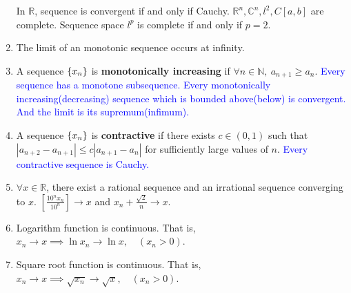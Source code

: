 \begin{enumerate}
		\subitem In $\mathbb{R}$, sequence is convergent if and only if Cauchy.
		\subitem $\mathbb{R}^n,\mathbb{C}^n,l^2,C[a,b]$ are complete.
		\subitem Sequence space $l^p$ is complete if and only if $p=2$.
	\item The limit of an monotonic sequence occurs at infinity.
	\item A sequence $\{x_n\}$ is \textbf{monotonically increasing} if $\forall n \in \mathbb{N},\ a_{n+1} \ge a_n$.
		\subitem \textcolor{blue}{Every sequence has a monotone subsequence.}
		\subitem \textcolor{blue}{Every monotonically increasing(decreasing) sequence which is bounded above(below) is convergent. And the limit is its supremum(infimum).}
	\item A sequence $\{x_n\}$ is \textbf{contractive} if there exists $c \in (0,1)$ such that $|a_{n+2}-a_{n+1}| \le c|a_{n+1}-a_n|$ for sufficiently large values of $n$.
		\subitem \textcolor{blue}{Every contractive sequence is Cauchy.}
	\item $\forall x \in \mathbb{R}$, there exist a rational sequence and an irrational sequence converging to $x$.
		$\left[ \frac{10^n x_n}{10^n} \right] \to x$ and $ x_n + \frac{\sqrt{2}}{n} \to x$.
	\item Logarithm function is continuous.
		That is, $x_n \to x \implies \ln{x_n} \to \ln{x}, \quad (x_n > 0)$.
	\item Square root function is continuous.
		That is, $x_n \to x \implies \sqrt{x_n} \to \sqrt{x}, \quad (x_n > 0)$.
\end{enumerate}
